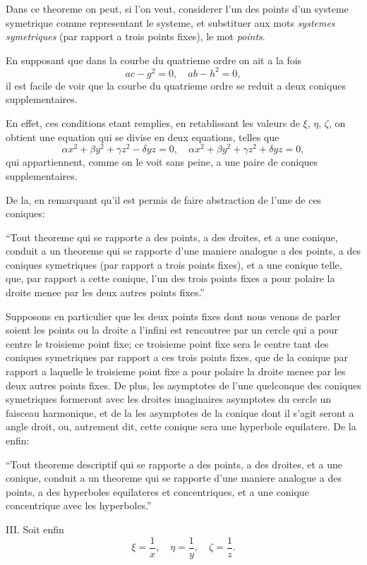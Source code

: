 \documentclass[12pt,a4paper]{article}
\begin{document}
Dans ce theoreme on peut, si l'on veut, considerer l'un des points d'un systeme symetrique comme representant le systeme, et substituer aux mots \textit{systemes symetriques} (par rapport a trois points fixes), le mot \textit{points}.

En supposant que dans la courbe du quatrieme ordre on ait a la fois
\[
ac - g^2 = 0, \quad ab - h^2 = 0,
\]
il est facile de voir que la courbe du quatrieme ordre se reduit a deux coniques supplementaires.

En effet, ces conditions etant remplies, en retablissant les valeurs de $\xi$, $\eta$, $\zeta$, on obtient une equation qui se divise en deux equations, telles que
\[
\alpha x^2 + \beta y^2 + \gamma z^2 - \delta yz = 0, \quad \alpha x^2 + \beta y^2 + \gamma z^2 + \delta yz = 0,
\]
qui appartiennent, comme on le voit sans peine, a une paire de coniques supplementaires.

De la, en remarquant qu'il est permis de faire abstraction de l'une de ces coniques:

``Tout theoreme qui se rapporte a des points, a des droites, et a une conique, conduit a un theoreme qui se rapporte d'une maniere analogue a des points, a des coniques symetriques (par rapport a trois points fixes), et a une conique telle, que, par rapport a cette conique, l'un des trois points fixes a pour polaire la droite menee par les deux autres points fixes.''

Supposons en particulier que les deux points fixes dont nous venons de parler soient les points ou la droite a l'infini est rencontree par un cercle qui a pour centre le troisieme point fixe; ce troisieme point fixe sera le centre tant des coniques symetriques par rapport a ces trois points fixes, que de la conique par rapport a laquelle le troisieme point fixe a pour polaire la droite menee par les deux autres points fixes. De plus, les asymptotes de l'une quelconque des coniques symetriques formeront avec les droites imaginaires asymptotes du cercle un faisceau harmonique, et de la les asymptotes de la conique dont il s'agit seront a angle droit, ou, autrement dit, cette conique sera une hyperbole equilatere. De la enfin:

``Tout theoreme descriptif qui se rapporte a des points, a des droites, et a une conique, conduit a un theoreme qui se rapporte d'une maniere analogue a des points, a des hyperboles equilateres et concentriques, et a une conique concentrique avec les hyperboles.''

\textsc{III.} Soit enfin
\[
\xi = \frac{1}{x}, \quad \eta = \frac{1}{y}, \quad \zeta = \frac{1}{z}.
\]
\end{document}
